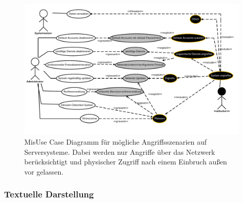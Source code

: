 \begin{figure}[h]
\includegraphics[scale=0.75,angle=90]{images/Server.pdf} 
\caption{MisUse Case Diagramm für mögliche Angriffsszenarien auf Serversysteme. Dabei werden nur Angriffe über das Netzwerk berücksichtigt und physischer Zugriff nach einem Einbruch außen vor gelassen.}
\end{figure}

\clearpage
\subsubsection{Textuelle Darstellung}

